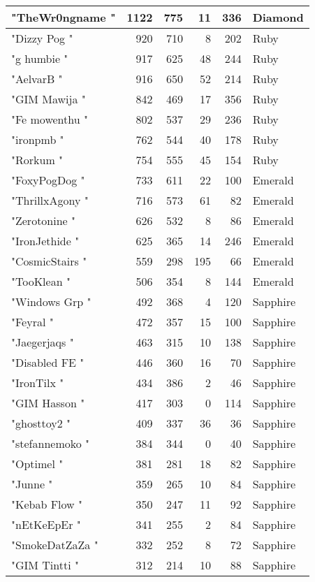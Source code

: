\documentclass{article}
\begin{document}
\begin{table}[htbp]
\begin{tabular}{|l|r|r|r|r|l|}
"TheWr0ngname " & 1122 & 775 & 11 & 336 & Diamond \\ \hline
"Dizzy Pog " & 920 & 710 & 8 & 202 & Ruby \\ \hline
"g humbie " & 917 & 625 & 48 & 244 & Ruby \\ \hline
"AelvarB " & 916 & 650 & 52 & 214 & Ruby \\ \hline
"GIM Mawija " & 842 & 469 & 17 & 356 & Ruby \\ \hline
"Fe mowenthu " & 802 & 537 & 29 & 236 & Ruby \\ \hline
"ironpmb " & 762 & 544 & 40 & 178 & Ruby \\ \hline
"Rorkum " & 754 & 555 & 45 & 154 & Ruby \\ \hline
"FoxyPogDog " & 733 & 611 & 22 & 100 & Emerald \\ \hline
"ThrillxAgony " & 716 & 573 & 61 & 82 & Emerald \\ \hline
"Zerotonine " & 626 & 532 & 8 & 86 & Emerald \\ \hline
"IronJethide " & 625 & 365 & 14 & 246 & Emerald \\ \hline
"CosmicStairs " & 559 & 298 & 195 & 66 & Emerald \\ \hline
"TooKlean " & 506 & 354 & 8 & 144 & Emerald \\ \hline
"Windows Grp " & 492 & 368 & 4 & 120 & Sapphire \\ \hline
"Feyral " & 472 & 357 & 15 & 100 & Sapphire \\ \hline
"Jaegerjaqs " & 463 & 315 & 10 & 138 & Sapphire \\ \hline
"Disabled FE " & 446 & 360 & 16 & 70 & Sapphire \\ \hline
"IronTilx " & 434 & 386 & 2 & 46 & Sapphire \\ \hline
"GIM Hasson " & 417 & 303 & 0 & 114 & Sapphire \\ \hline
"ghosttoy2 " & 409 & 337 & 36 & 36 & Sapphire \\ \hline
"stefannemoko " & 384 & 344 & 0 & 40 & Sapphire \\ \hline
"Optimel " & 381 & 281 & 18 & 82 & Sapphire \\ \hline
"Junne " & 359 & 265 & 10 & 84 & Sapphire \\ \hline
"Kebab Flow " & 350 & 247 & 11 & 92 & Sapphire \\ \hline
"nEtKeEpEr " & 341 & 255 & 2 & 84 & Sapphire \\ \hline
"SmokeDatZaZa " & 332 & 252 & 8 & 72 & Sapphire \\ \hline
"GIM Tintti " & 312 & 214 & 10 & 88 & Sapphire \\ \hline

\end{tabular}
\end{table}
\end{document}
